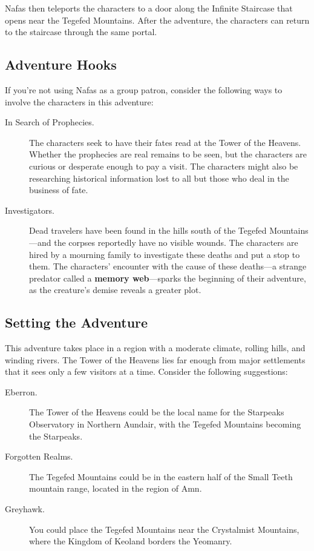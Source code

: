 \documentclass[10pt,a4paper,twoside,bg=print,twocolumn,openany,nodeprecatedcode]{dndbook}
\begin{document}
Nafas then teleports the characters to a door along the Infinite Staircase that opens near the Tegefed Mountains. After the adventure, the characters can return to the staircase through the same portal.

\subsection{Adventure Hooks}
If you're not using Nafas as a group patron, consider the following ways to involve the characters in this adventure:


\begin{description}
\item[In Search of Prophecies.]
The characters seek to have their fates read at the Tower of the Heavens. Whether the prophecies are real remains to be seen, but the characters are curious or desperate enough to pay a visit. The characters might also be researching historical information lost to all but those who deal in the business of fate.
\item[Investigators.]
Dead travelers have been found in the hills south of the Tegefed Mountains—and the corpses reportedly have no visible wounds. The characters are hired by a mourning family to investigate these deaths and put a stop to them. The characters' encounter with the cause of these deaths—a strange predator called a \textbf{memory web}—sparks the beginning of their adventure, as the creature's demise reveals a greater plot.
\end{description}

\subsection{Setting the Adventure}
This adventure takes place in a region with a moderate climate, rolling hills, and winding rivers. The Tower of the Heavens lies far enough from major settlements that it sees only a few visitors at a time. Consider the following suggestions:


\begin{description}
\item[Eberron.]
The Tower of the Heavens could be the local name for the Starpeaks Observatory in Northern Aundair, with the Tegefed Mountains becoming the Starpeaks.
\item[Forgotten Realms.]
The Tegefed Mountains could be in the eastern half of the Small Teeth mountain range, located in the region of Amn.
\item[Greyhawk.]
You could place the Tegefed Mountains near the Crystalmist Mountains, where the Kingdom of Keoland borders the Yeomanry.
\end{description}
\end{document}
